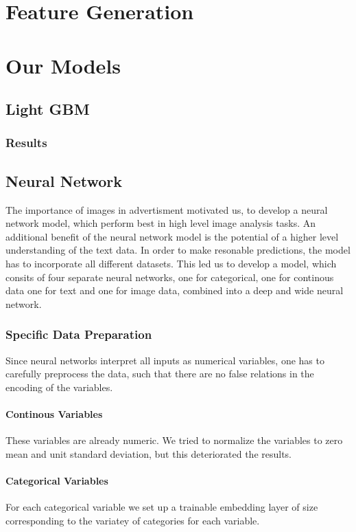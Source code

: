 \documentclass[runningheads]{llncs}
\begin{document}
 \section{Feature Generation}
 \section{Our Models}
 \subsection{Light GBM}
 \subsubsection{Results}
 \subsection{Neural Network}
 The importance of images in advertisment motivated us, to develop a neural network model, which perform best in high level image analysis tasks. An additional benefit of the neural network model is the potential of a higher level understanding of the text data. In order to make resonable predictions, the model has to incorporate all different datasets. This led us to develop a  model, which consits of four separate neural networks, one for categorical, one for continous data one for text and one for image data, combined into a deep and wide neural network.
 \subsubsection{Specific Data Preparation}
 Since neural networks interpret all inputs as numerical variables, one has to carefully preprocess the data, such that there are no false relations in the encoding of the variables.
 \paragraph{Continous Variables} These variables are already numeric. We tried to normalize the variables to zero mean and unit standard deviation, but this deteriorated the results. %
 \paragraph{Categorical Variables} For each categorical variable we set up a trainable embedding layer of size corresponding to the variatey of categories for each variable. %
\end{document}
